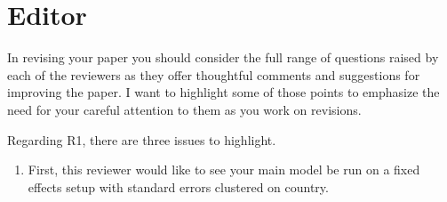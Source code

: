 \section{Editor}


In revising your paper you should consider the full range of questions raised by each of the reviewers as they offer thoughtful comments and suggestions for improving the paper. I want to highlight some of those points to emphasize the need for your careful attention to them as you work on revisions.

Regarding R1, there are three issues to highlight. 
\begin{enumerate}
\item  First, this reviewer would like to see your main model be run on a fixed effects setup with standard errors clustered on country. \\


\end{enumerate}
